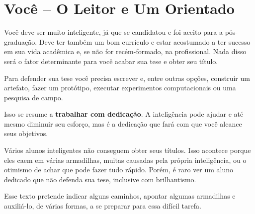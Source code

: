 \section{Você – O Leitor e Um Orientado}

Você deve ser muito inteligente, já que se candidatou e foi aceito para a pós-graduação. Deve ter também um bom currículo e estar acostumado a ter sucesso em sua vida acadêmica e, se não for recém-formado, na profissional.
Nada disso será o fator determinante para você acabar sua tese e obter seu título.

Para defender sua tese você precisa escrever e, entre outras opções, construir um artefato, fazer um protótipo, executar experimentos computacionais ou uma pesquisa de campo.

Isso se resume a \textbf{trabalhar com dedicação}. A inteligência pode ajudar e até mesmo diminuir seu esforço, mas é a dedicação que fará com que você alcance seus objetivos.

Vários alunos inteligentes não conseguem obter seus títulos. Isso acontece porque eles caem em várias armadilhas, muitas causadas pela própria inteligência, ou o otimismo de achar que pode fazer tudo rápido. Porém, é raro ver um aluno dedicado que não defenda sua tese, inclusive com brilhantismo.

Esse texto pretende indicar alguns caminhos, apontar algumas armadilhas e auxiliá-lo, de várias formas, a se preparar para essa difícil tarefa.

